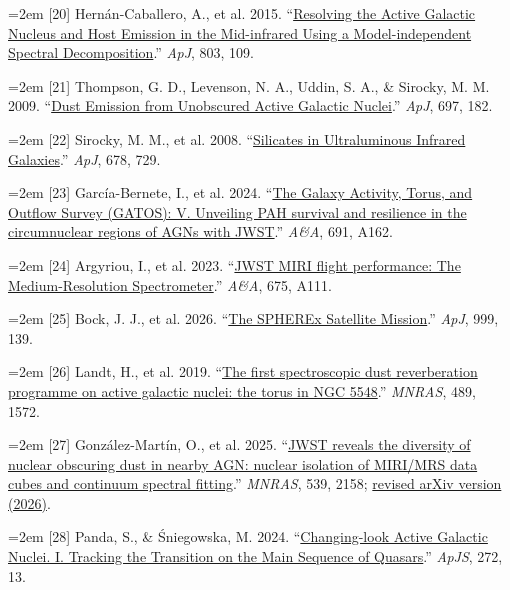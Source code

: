 \documentclass[12pt]{article}
\begin{document}
\noindent\hangindent=2em [20] Hern\'an-Caballero, A., et al. 2015. ``\href{https://doi.org/10.1088/0004-637x/803/2/109}{Resolving the Active Galactic Nucleus and Host Emission in the Mid-infrared Using a Model-independent Spectral Decomposition}.'' \emph{ApJ}, 803, 109.\par
\noindent\hangindent=2em [21] Thompson, G. D., Levenson, N. A., Uddin, S. A., \& Sirocky, M. M. 2009. ``\href{https://doi.org/10.1088/0004-637x/697/1/182}{Dust Emission from Unobscured Active Galactic Nuclei}.'' \emph{ApJ}, 697, 182.\par
\noindent\hangindent=2em [22] Sirocky, M. M., et al. 2008. ``\href{https://doi.org/10.1086/586727}{Silicates in Ultraluminous Infrared Galaxies}.'' \emph{ApJ}, 678, 729.\par
\noindent\hangindent=2em [23] Garc\'ia-Bernete, I., et al. 2024. ``\href{https://doi.org/10.1051/0004-6361/202450086}{The Galaxy Activity, Torus, and Outflow Survey (GATOS): V. Unveiling PAH survival and resilience in the circumnuclear regions of AGNs with JWST}.'' \emph{A\&A}, 691, A162.\par
\noindent\hangindent=2em [24] Argyriou, I., et al. 2023. ``\href{https://doi.org/10.1051/0004-6361/202346489}{JWST MIRI flight performance: The Medium-Resolution Spectrometer}.'' \emph{A\&A}, 675, A111.\par
\noindent\hangindent=2em [25] Bock, J. J., et al. 2026. ``\href{https://doi.org/10.3847/1538-4357/ae2be2}{The SPHEREx Satellite Mission}.'' \emph{ApJ}, 999, 139.\par
\noindent\hangindent=2em [26] Landt, H., et al. 2019. ``\href{https://doi.org/10.1093/mnras/stz2212}{The first spectroscopic dust reverberation programme on active galactic nuclei: the torus in NGC 5548}.'' \emph{MNRAS}, 489, 1572.\par
\noindent\hangindent=2em [27] Gonz\'alez-Mart\'in, O., et al. 2025. ``\href{https://doi.org/10.1093/mnras/staf573}{JWST reveals the diversity of nuclear obscuring dust in nearby AGN: nuclear isolation of MIRI/MRS data cubes and continuum spectral fitting}.'' \emph{MNRAS}, 539, 2158; \href{https://arxiv.org/abs/2504.01103v2}{revised arXiv version (2026)}.\par
\noindent\hangindent=2em [28] Panda, S., \& \'Sniegowska, M. 2024. ``\href{https://doi.org/10.3847/1538-4365/ad344f}{Changing-look Active Galactic Nuclei. I. Tracking the Transition on the Main Sequence of Quasars}.'' \emph{ApJS}, 272, 13.\par
\end{document}
